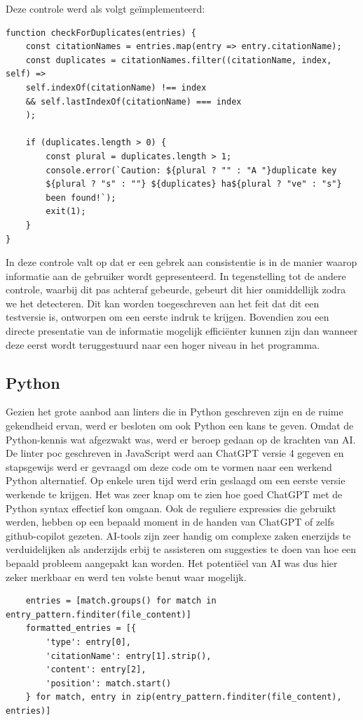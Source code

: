 \begin{minipage}{\pdfpagewidth}
Deze controle werd als volgt geïmplementeerd:

\begin{verbatim}
function checkForDuplicates(entries) {
    const citationNames = entries.map(entry => entry.citationName);
    const duplicates = citationNames.filter((citationName, index, self) => 
    self.indexOf(citationName) !== index 
    && self.lastIndexOf(citationName) === index
    );

    if (duplicates.length > 0) {
        const plural = duplicates.length > 1;
        console.error(`Caution: ${plural ? "" : "A "}duplicate key
        ${plural ? "s" : ""} ${duplicates} ha${plural ? "ve" : "s"} 
        been found!`);
        exit(1);
    }
}
\end{verbatim}
\end{minipage}
In deze controle valt op dat er een gebrek aan consistentie is in de manier waarop informatie aan de gebruiker wordt gepresenteerd. In tegenstelling tot de andere controle, waarbij dit pas achteraf gebeurde, gebeurt dit hier onmiddellijk zodra we het detecteren. Dit kan worden toegeschreven aan het feit dat dit een testversie is, ontworpen om een eerste indruk te krijgen. Bovendien zou een directe presentatie van de informatie mogelijk efficiënter kunnen zijn dan wanneer deze eerst wordt teruggestuurd naar een hoger niveau in het programma.

\subsection{Python}
\label{subsec:python}
Gezien het grote aanbod aan linters die in Python geschreven zijn en de ruime gekendheid ervan, werd er besloten om ook Python een kans te geven. Omdat de Python-kennis wat afgezwakt was, werd er beroep gedaan op de krachten van AI. De linter poc geschreven in JavaScript werd aan ChatGPT versie 4 gegeven en stapsgewijs werd er gevraagd om deze code om te vormen naar een werkend Python alternatief. Op enkele uren tijd werd erin geslaagd om een eerste versie werkende te krijgen. Het was zeer knap om te zien hoe goed ChatGPT met de Python syntax effectief kon omgaan. Ook de reguliere expressies die gebruikt werden, hebben op een bepaald moment in de handen van ChatGPT of zelfs github-copilot gezeten. AI-tools zijn zeer handig om complexe zaken enerzijds te verduidelijken als anderzijds erbij te assisteren om suggesties te doen van hoe een bepaald probleem aangepakt kan worden. Het potentiëel van AI was dus hier zeker merkbaar en werd ten volste benut waar mogelijk.
\pagebreak
\begin{verbatim}
    entries = [match.groups() for match in entry_pattern.finditer(file_content)]
    formatted_entries = [{
        'type': entry[0],
        'citationName': entry[1].strip(),
        'content': entry[2],
        'position': match.start()
    } for match, entry in zip(entry_pattern.finditer(file_content), entries)]

\end{verbatim}

